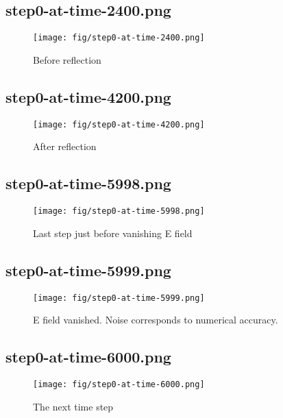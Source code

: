 \documentclass[fullscreen=true]{beamer}
\begin{document}
\subsection{step0-at-time-2400.png}
\begin{frame}
  \begin{figure}
    \texttt{[image: fig/step0-at-time-2400.png]}%
    \caption{Before reflection}
  \end{figure}
\end{frame}

\subsection{step0-at-time-4200.png}
\begin{frame}
  \begin{figure}
    \texttt{[image: fig/step0-at-time-4200.png]}%
    \caption{After reflection}
  \end{figure}
\end{frame}

\subsection{step0-at-time-5998.png}
\begin{frame}
  \begin{figure}
    \texttt{[image: fig/step0-at-time-5998.png]}%
    \caption{Last step just before vanishing E field}
  \end{figure}
\end{frame}

\subsection{step0-at-time-5999.png}
\begin{frame}
  \begin{figure}
    \texttt{[image: fig/step0-at-time-5999.png]}%
    \caption{E field vanished. Noise corresponds to numerical accuracy. }
  \end{figure}
\end{frame}

\subsection{step0-at-time-6000.png}
\begin{frame}
  \begin{figure}
    \texttt{[image: fig/step0-at-time-6000.png]}%
    \caption{The next time step}
  \end{figure}
\end{frame}
\end{document}
